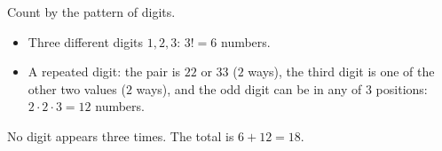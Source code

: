 Count by the pattern of digits.
\begin{itemize}
\item Three different digits $1,2,3$: $3!=6$ numbers.
\item A repeated digit: the pair is $22$ or $33$ ($2$ ways), the third digit is one of the other two values ($2$ ways), and the odd digit can be in any of $3$ positions: $2\cdot2\cdot3=12$ numbers.
\end{itemize}
No digit appears three times. The total is $6+12=\boxed{18}$.
